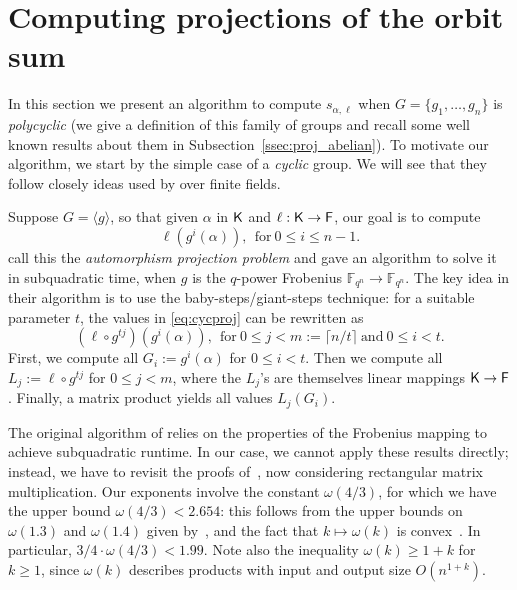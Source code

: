  \section{Computing projections of the orbit sum}
\label{sec:osum}

In this section we present an algorithm to compute $s_{\alpha,\ell}$
when $G=\{g_1,\dots,g_n\}$ is {\em polycyclic} (we give a definition
of this family of groups and recall some well known results about them
in Subsection~\ref{ssec:proj_abelian}). To motivate our algorithm,
we start by the simple case of a {\em cyclic} group.  We will see that
they follow closely ideas used by \cite{KalSho98} over finite fields.

Suppose $G = \langle g \rangle$, so that given $\alpha$ in ${\mathsf{K}}$ and
$\ell: {\mathsf{K}} \to {\mathsf{F}}$, our goal is to compute
\begin{equation}
  \label{eq:cycproj}
  \ell(g^i(\alpha)), ~~\mbox{for}~ 0\leq i\leq n-1.
\end{equation}
\cite{KalSho98} call this the \emph{automorphism projection problem} and
gave an algorithm to solve it in subquadratic time, when $g$ is the
$q$-power Frobenius $\mathbb{F}_{q^n} \to \mathbb{F}_{q^n}$.  The key idea in their
algorithm is to use the baby-steps/giant-steps technique: for a suitable
parameter $t$, the values in \eqref{eq:cycproj} can be rewritten as
\[
  (\ell \circ g^{tj})(g^i(\alpha)), ~~\mbox{for}~ 0 \leq j < m:=\lceil n/t
  \rceil ~\mbox{and}~ 0 \leq i <t.
\]
First, we compute all $G_i:=g^i(\alpha)$ for $0 \leq i <t$.  Then we compute
all $L_j:=\ell \circ g^{tj}$ for $0 \leq j <m$, where the $L_j$'s are
themselves linear mappings ${\mathsf{K}} \to {\mathsf{F}}$.  Finally, a matrix product yields
all values $L_j(G_i)$.

The original algorithm of \cite{KalSho98} relies on the properties of
the Frobenius mapping to achieve subquadratic runtime. In our case, we
cannot apply these results directly; instead, we have to revisit the
proofs of~\cite[Lemmata 3 and 4]{KalSho98}, now considering
rectangular matrix multiplication.  Our exponents involve the constant
$\omega(4/3)$, for which we have the upper bound $\omega(4/3) <
2.654$: this follows from the upper bounds on $\omega(1.3)$ and
$\omega(1.4)$ given by~\cite{LeGall}, and the fact that $k \mapsto
\omega(k)$ is convex~\citep{LoRo83}. In particular, $3/4 \cdot
\omega(4/3) < 1.99$. Note also the inequality $\omega(k) \ge 1+k$ for
$k\ge 1$, since $\omega(k)$ describes products with input and output
size $O(n^{1+k})$.

